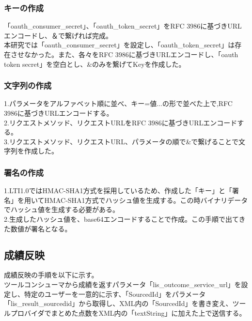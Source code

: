 \subsubsection{キーの作成}
「oauth\_consumer\_secret」、「oauth\_token\_secret」をRFC 3986に基づきURLエンコードし、＆で繋げれば完成。\\
本研究では「oauth\_consumer\_secret」を設定し、「oauth\_token\_secret」は存在させなかった。また、各々をRFC 3986に基づきURLエンコードし、「oauth token secret」を空白とし、\&のみを繋げてKeyを作成した。
\subsubsection{文字列の作成}
1.パラメータをアルファベット順に並べ、キー=値...の形で並べた上で,RFC 3986に基づきURLエンコードする。\\
2.リクエストメソッド、リクエストURLをRFC 3986に基づきURLエンコードする。\\
3.リクエストメソッド、リクエストURL、パラメータの順で\&で繋げることで文字列を作成した。\\
\subsubsection{署名の作成}
1.LTI1.0ではHMAC-SHA1方式を採用しているため、作成した「キー」と「署名」を用いてHMAC-SHA1方式でハッシュ値を生成する。この時バイナリデータでハッシュ値を生成する必要がある。\\
2.生成したハッシュ値を、base64エンコードすることで作成。この手順で出てきた数値が署名となる。\\
\subsection{成績反映}
成績反映の手順を以下に示す。\\
ツールコンシューマから成績を返すパラメータ「lis\_outcome\_service\_url」を設定し、特定のユーザーを一意的に示す、「SourcedId」をパラメータ「lis\_result\_sourcedid」から取得し、XML内の「SourcedId」を書き変え、ツールプロバイダでまとめた点数をXML内の「textString」に加えた上で送信する。\\
